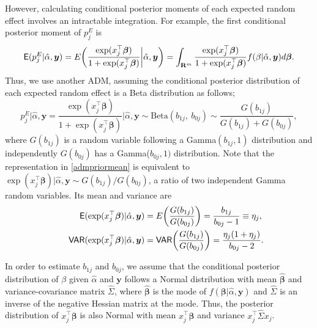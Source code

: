 \documentclass[article]{jss}
\begin{document}
However, calculating conditional posterior moments of each expected random effect involves an intractable integration. For example, the first conditional posterior moment of $p^E_j$ is
\begin{equation}\label{priormoment1}
\mathsf{E}(p^E_{j}\vert\hat{\alpha}, \boldsymbol{y})=E\bigg(\frac{\exp(x_j^\top\boldsymbol{\beta})}{1+\exp(x_j^\top\boldsymbol{\beta})}\bigg\vert\hat{\alpha}, \boldsymbol{y}\bigg)=\int_{\mathbf{R}^{m}} \frac{\exp(x_j^\top\boldsymbol{\beta})}{1+\exp(x_j^\top\boldsymbol{\beta})}f(\beta\vert\hat{\alpha}, \boldsymbol{y})d\boldsymbol{\beta}.
\end{equation}
Thus, we use another ADM, assuming the conditional posterior distribution of each expected random effect is a Beta distribution as follows;
\begin{equation}\label{admpriormean}
p^E_{j}\vert\hat{\alpha}, \boldsymbol{y}=\frac{\exp(x_j^\top\boldsymbol{\beta})}{1+\exp(x_j^\top\boldsymbol{\beta})}\bigg\vert\hat{\alpha}, \boldsymbol{y}\sim \textrm{Beta}(b_{1j},~ b_{0j})\sim \frac{G(b_{1j})}{G(b_{1j})+G(b_{0j})},
\end{equation}
where $G(b_{1j})$ is a random variable following a Gamma$(b_{1j}, 1)$ distribution and independently $G(b_{0j})$ has a Gamma($b_{0j}, 1)$ distribution.  Note that the representation in  \eqref{admpriormean} is equivalent to  $\exp(x_j^\top\boldsymbol{\beta})\vert\hat{\alpha}, \boldsymbol{y}\sim G(b_{1j})/G(b_{0j})$, a ratio of two independent Gamma random variables. Its mean and variance are
\begin{align}
\mathsf{E}(\exp(x_j^\top\boldsymbol{\beta})\vert\hat{\alpha}, \boldsymbol{y})&=E\bigg(\frac{G(b_{1j})}{G(b_{0j})}\bigg)=\frac{b_{1j}}{b_{0j}-1}\equiv\eta_j,\label{priormean1}\\
~~~~~\mathsf{VAR}(\exp(x_j^\top\boldsymbol{\beta})\vert\hat{\alpha}, \boldsymbol{y})&=\mathsf{VAR}\bigg(\frac{G(b_{1j})}{G(b_{0j})}\bigg)=\frac{\eta_j(1+\eta_j)}{b_{0j}-2}.\label{priorvariance1}
\end{align}

In order to estimate $b_{1j}$ and $b_{0j}$, we assume that the conditional posterior distribution of $\beta$ given $\hat{\alpha}$ and $\boldsymbol{y}$ follows a Normal distribution with mean $\hat{\boldsymbol{\beta}}$ and variance-covariance matrix $\hat{\Sigma}$, where $\hat{\boldsymbol{\beta}}$ is the mode of $f(\boldsymbol{\beta}\vert \hat{\alpha}, \boldsymbol{y})$  and $\hat{\Sigma}$ is an inverse of the negative Hessian matrix at the mode. Thus, the posterior distribution of $x_j^\top\boldsymbol{\beta}$ is also Normal with mean $x_j^\top\hat{\boldsymbol{\beta}}$ and variance $x_j^\top\hat{\Sigma} x_j$.
\end{document}
